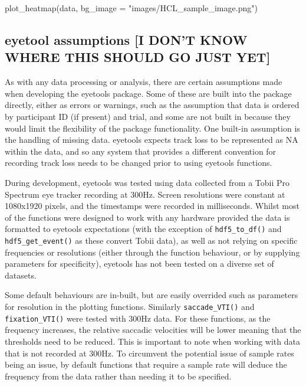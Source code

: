 \documentclass[
  man,
  floatsintext,
  longtable,
  nolmodern,
  notxfonts,
  notimes,
  colorlinks=true,linkcolor=blue,citecolor=blue,urlcolor=blue]{apa7}
\newenvironment{Shaded}{\begin{snugshade}}{\end{snugshade}}
\newcommand{\AttributeTok}[1]{\textcolor[rgb]{0.40,0.45,0.13}{#1}}
\newcommand{\FunctionTok}[1]{\textcolor[rgb]{0.28,0.35,0.67}{#1}}
\newcommand{\NormalTok}[1]{\textcolor[rgb]{0.00,0.23,0.31}{#1}}
\newcommand{\StringTok}[1]{\textcolor[rgb]{0.13,0.47,0.30}{#1}}
\begin{document}
\begin{Shaded}
\begin{Highlighting}[]
\FunctionTok{plot\_heatmap}\NormalTok{(data, }\AttributeTok{bg\_image =} \StringTok{"images/HCL\_sample\_image.png"}\NormalTok{)}
\end{Highlighting}
\end{Shaded}

\subsection{eyetool assumptions {[}I DON'T KNOW WHERE THIS SHOULD GO
JUST
YET{]}}\label{eyetool-assumptions-i-dont-know-where-this-should-go-just-yet}

As with any data processing or analysis, there are certain assumptions
made when developing the eyetools package. Some of these are built into
the package directly, either as errors or warnings, such as the
assumption that data is ordered by participant ID (if present) and
trial, and some are not built in because they would limit the
flexibility of the package functionality. One built-in assumption is the
handling of missing data. eyetools expects track loss to be represented
as NA within the data, and so any system that provides a different
convention for recording track loss needs to be changed prior to using
eyetools functions.

During development, eyetools was tested using data collected from a
Tobii Pro Spectrum eye tracker recording at 300Hz. Screen resolutions
were constant at 1080x1920 pixels, and the timestamps were recorded in
milliseconds. Whilst most of the functions were designed to work with
any hardware provided the data is formatted to eyetools expectations
(with the exception of \texttt{hdf5\_to\_df()} and
\texttt{hdf5\_get\_event()} as these convert Tobii data), as well as not
relying on specific frequencies or resolutions (either through the
function behaviour, or by supplying parameters for specificity),
eyetools has not been tested on a diverse set of datasets.

Some default behaviours are in-built, but are easily overrided such as
parameters for resolution in the plotting functions. Similarly
\texttt{saccade\_VTI()} and \texttt{fixation\_VTI()} were tested with
300Hz data. For these functions, as the frequency increases, the
relative saccadic velocities will be lower meaning that the thresholds
need to be reduced. This is important to note when working with data
that is not recorded at 300Hz. To circumvent the potential issue of
sample rates being an issue, by default functions that require a sample
rate will deduce the frequency from the data rather than needing it to
be specified.
\end{document}
